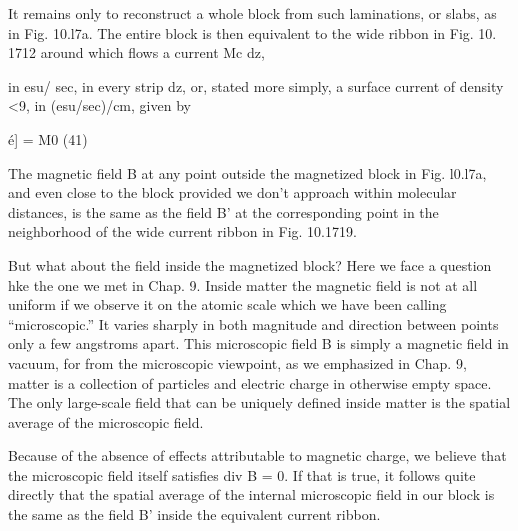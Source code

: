 It remains only to reconstruct a whole block from such 
laminations, or slabs, as in Fig. 10.l7a. The entire block is then equivalent
to the wide ribbon in Fig. 10. 1712 around which flows a current Mc dz,

in esu/ sec, in every strip dz, or, stated more simply, a surface current
of density <9, in (esu/sec)/cm, given by
\begin{equation}
\end{equation}

é] = M0 (41)

The magnetic field B at any point outside the magnetized block in
Fig. l0.l7a, and even close to the block provided we don't approach
within molecular distances, is the same as the field B' at the corresponding
point in the neighborhood of the wide current ribbon in
Fig. 10.1719.

But what about the field inside the magnetized block? Here we
face a question hke the one we met in Chap. 9. Inside matter the
magnetic field is not at all uniform if we observe it on the atomic
scale which we have been calling ``microscopic.'' It varies sharply
in both magnitude and direction between points only a few angstroms
apart. This microscopic field B is simply a magnetic field in vacuum,
for from the microscopic viewpoint, as we emphasized in Chap. 9,
matter is a collection of particles and electric charge in otherwise
empty space. The only large-scale field that can be uniquely defined
inside matter is the spatial average of the microscopic field.

Because of the absence of effects attributable to magnetic charge,
we believe that the microscopic field itself satisfies div B = 0. If that
is true, it follows quite directly that the spatial average of the internal
microscopic field in our block is the same as the field B' inside the
equivalent current ribbon.


